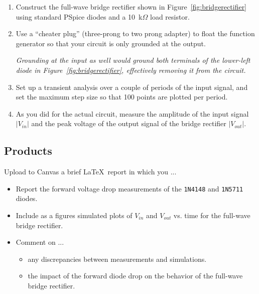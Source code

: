 \documentclass[11pt]{article}
\begin{document}
\begin{enumerate}
\item Construct the full-wave bridge rectifier shown in
  Figure~\ref{fig:bridgerectifier} using standard PSpice diodes
  and a 10~k$\Omega$ load resistor.

\item Use a ``cheater plug'' (three-prong to two prong adapter) to
  float the function generator so that your circuit is only grounded
  at the output.

  \emph{Grounding at the input as well would ground both terminals of
    the lower-left diode in Figure~\ref{fig:bridgerectifier},
    effectively removing it from the circuit.}
  
\item Set up a transient analysis over a couple of periods of the
  input signal, and set the maximum step size so that 100
  points are plotted per period.

\item As you did for the actual circuit, measure the amplitude of the
  input signal $|V_{in}|$ and the peak voltage of the output signal of
  the bridge rectifier $|V_{out}|$.
  
\end{enumerate}

\subsection*{Products}

Upload to Canvas a brief \LaTeX\ report in which you ...
\begin{itemize}
\item Report the forward voltage drop measurements of the
  \texttt{1N4148} and \texttt{1N5711} diodes.

\item Include as a figures simulated plots of $V_{in}$
  and $V_{out}$ vs. time for the full-wave bridge rectifier.

\item Comment on ...
  \begin{itemize}
    \item any discrepancies between measurements and
      simulations.

  \item the impact of the forward diode drop on the behavior
    of the full-wave bridge rectifier.
  \end{itemize}

\end{itemize}
\end{document}
